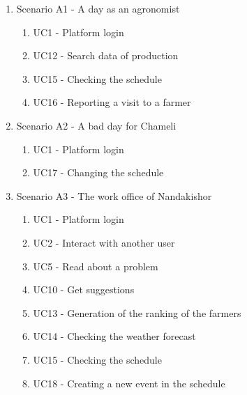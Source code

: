 \begin{enumerate} [label=]
    \item Scenario A1 - A day as an agronomist
    \begin{enumerate}[label=]
        \item UC1 - Platform login
        \item UC12 - Search data of production
        \item UC15 - Checking the schedule
        \item UC16 - Reporting a visit to a farmer
    \end{enumerate}
    \item Scenario A2 - A bad day for Chameli
    \begin{enumerate}[label=]
        \item UC1 - Platform login
        \item UC17 - Changing the schedule
    \end{enumerate}
    \item Scenario A3 - The work office of Nandakishor
    \begin{enumerate}[label=]
        \item UC1 - Platform login
        \item UC2 - Interact with another user
        \item UC5 - Read about a problem
        \item UC10 - Get suggestions
        \item UC13 - Generation of the ranking of the farmers
        \item UC14 - Checking the weather forecast
        \item UC15 - Checking the schedule
        \item UC18 - Creating a new event in the schedule
    \end{enumerate}
\end{enumerate}

